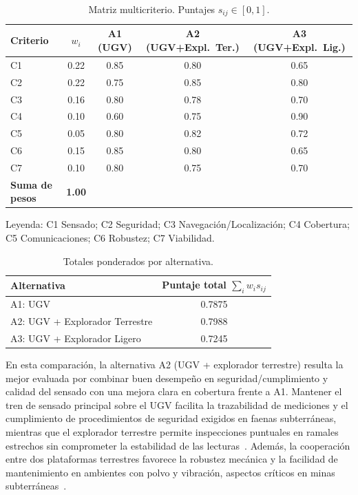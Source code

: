 
\begin{table}[H]
\centering
\caption{Matriz multicriterio. Puntajes $s_{ij}\in[0,1]$.}
\label{tab:matriz_compacta}
\small
\renewcommand{\arraystretch}{1.15}
\begin{tabular}{@{}lcccc@{}}
\toprule
Criterio & $w_i$ & A1 (UGV) & A2 (UGV+Expl.\ Ter.) & A3 (UGV+Expl.\ Lig.) \\
\midrule
C1 & 0.22 & 0.85 & 0.80 & 0.65 \\
C2 & 0.22 & 0.75 & 0.85 & 0.80 \\
C3 & 0.16 & 0.80 & 0.78 & 0.70 \\
C4 & 0.10 & 0.60 & 0.75 & 0.90 \\
C5 & 0.05 & 0.80 & 0.82 & 0.72 \\
C6 & 0.15 & 0.85 & 0.80 & 0.65 \\
C7 & 0.10 & 0.80 & 0.75 & 0.70 \\
\midrule
\textbf{Suma de pesos} & \textbf{1.00} &  &  &  \\
\bottomrule
\end{tabular}

\vspace{0.35em}
\footnotesize
Leyenda: C1 Sensado; C2 Seguridad; C3 Navegación/Localización; C4 Cobertura;
C5 Comunicaciones; C6 Robustez; C7 Viabilidad.
\end{table}


\begin{table}[H]
\centering
\caption{Totales ponderados por alternativa.}
\label{tab:totales_compacto}
\small
\renewcommand{\arraystretch}{1.15}
\begin{tabular}{@{}lc@{}}
\toprule
Alternativa & Puntaje total $\sum_i w_i s_{ij}$ \\
\midrule
A1: UGV & 0.7875 \\
A2: UGV + Explorador Terrestre & 0.7988 \\
A3: UGV + Explorador Ligero & 0.7245 \\
\bottomrule
\end{tabular}
\end{table}


En esta comparación, la alternativa A2 (UGV + explorador terrestre) resulta la mejor evaluada por combinar buen desempeño en seguridad/cumplimiento y calidad del sensado con una mejora clara en cobertura frente a A1. Mantener el tren de sensado principal sobre el UGV facilita la trazabilidad de mediciones y el cumplimiento de procedimientos de seguridad exigidos en faenas subterráneas, mientras que el explorador terrestre permite inspecciones puntuales en ramales estrechos sin comprometer la estabilidad de las lecturas~\cite{MINEM_DS024_2016,OSINERGMIN_BoletinGSM_2020b,EU_ExposureDirective_2020}. Además, la cooperación entre dos plataformas terrestres favorece la robustez mecánica y la facilidad de mantenimiento en ambientes con polvo y vibración, aspectos críticos en minas subterráneas~\cite{AdvancesMining_2023}.

